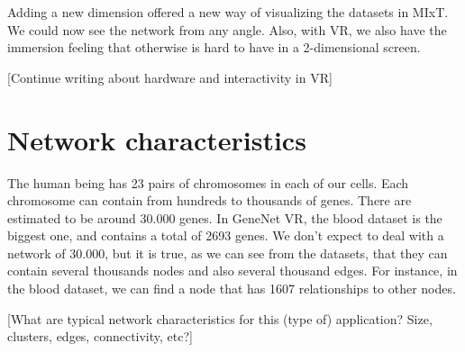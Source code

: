 Adding a new dimension offered a new way of visualizing the datasets in MIxT. We could now see the network from any angle. Also, with VR, we also have the immersion feeling that otherwise is hard to have in a 2-dimensional screen.

[Continue writing about hardware and interactivity in VR]

\section{Network characteristics}
The human being has 23 pairs of chromosomes in each of our cells. Each chromosome can contain from hundreds to thousands of genes. There are estimated to be around 30.000 genes. In GeneNet VR, the blood dataset is the biggest one, and contains a total of 2693 genes. We don't expect to deal with a network of 30.000, but it is true, as we can see from the datasets, that they can contain several thousands nodes and also several thousand edges. For instance, in the blood dataset, we can find a node that has 1607 relationships to other nodes.

[What are typical network characteristics for this (type of) application? Size, clusters, edges, connectivity, etc?]
